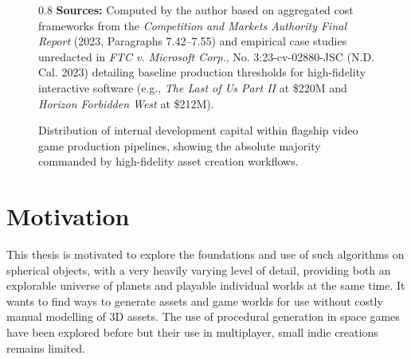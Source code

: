 \documentclass[12pt]{report}
\begin{document}
\begin{figure}[htbp]
\centering
{}
\caption{Distribution of internal development capital within flagship video game production pipelines, showing the absolute majority commanded by high-fidelity asset creation workflows.}
\label{fig:budget_breakdown}
\begin{spacing}{0.8}
\vskip 2mm
\noindent\footnotesize{\textbf{Sources:} Computed by the author based on aggregated cost frameworks from the \textit{Competition and Markets Authority Final Report} (2023, Paragraphs 7.42--7.55) \cite{cma2023videogames} and empirical case studies unredacted in \textit{FTC v. Microsoft Corp.}, No. 3:23-cv-02880-JSC (N.D. Cal. 2023) \cite{ftcvmicrosoft2023} detailing baseline production thresholds for high-fidelity interactive software (e.g., \textit{The Last of Us Part II} at \$220M and \textit{Horizon Forbidden West} at \$212M).}
\end{spacing}
\end{figure}

\newpage

\section{Motivation}

This thesis is motivated to explore the foundations and use of such algorithms on spherical objects, with a very heavily varying level of detail, providing both an explorable universe of planets and playable individual worlds at the same time. It wants to find ways to generate assets and game worlds for use without costly manual modelling of 3D assets. The use of procedural generation in space games have been explored before but their use in multiplayer, small indie creations remains limited. 
\end{document}
